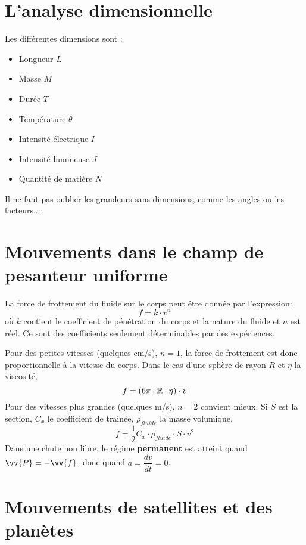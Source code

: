 \documentclass[main.tex]{subfiles}
\begin{document}
\section{L'analyse dimensionnelle}

\begin{Definition}
    Les différentes dimensions sont :
    \begin{itemize}
        \item Longueur $L$
        \item Masse $M$
        \item Durée $T$
        \item Température $\theta$
        \item Intensité électrique $I$
        \item Intensité lumineuse $J$
        \item Quantité de matière $N$
    \end{itemize}
    Il ne faut pas oublier les grandeurs sans dimensions, comme les angles ou les facteurs...
\end{Definition}


\section{Mouvements dans le champ de pesanteur uniforme}

\begin{Definition}
    La force de frottement du fluide sur le corps peut être donnée par l'expression:
    $$f=k\cdot v^n$$
    où $k$ contient le coefficient de pénétration du corps et la nature du fluide et $n$ est réel. Ce sont des coefficients seulement déterminables par des expériences.

    Pour des petites vitesses (quelques cm/s), $n=1$, la force de frottement est donc proportionnelle à la vitesse du corps. Dans le cas d'une sphère de rayon $R$ et $\eta$ la viscosité,
    $$f=(6\pi\cdot\mathbb{R}\cdot\eta )\cdot v$$
    Pour des vitesses plus grandes (quelques m/s), $n=2$ convient mieux. Si $S$ est la section, $C_{x}$ le coefficient de trainée, $\rho_{fluide}$ la masse volumique,
    $$ f=\frac{1}{2}C_{x}\cdot\rho_{fluide}\cdot S\cdot v^2 $$
    Dans une chute non libre, le régime \textbf{permanent} est atteint quand $\vv{P}=-\vv{f}$, donc quand $a=\dfrac{dv}{dt}=0$.
\end{Definition}


\section{Mouvements de satellites et des planètes}
\end{document}
